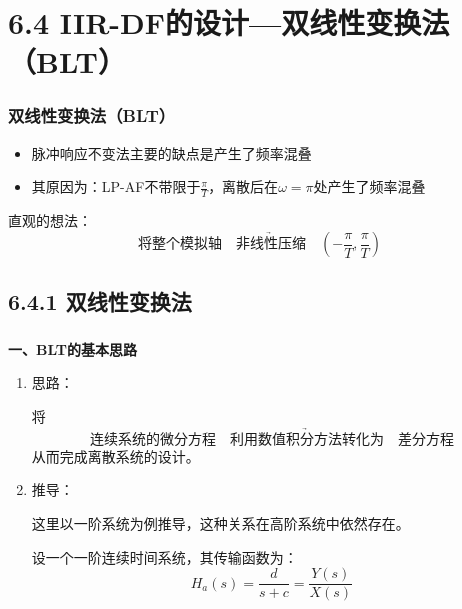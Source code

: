 \documentclass[notheorems,compress,mathserif,table]{beamer}
\begin{document}
\section{6.4 IIR-DF的设计—双线性变换法（BLT）}

\begin{frame}\frametitle{双线性变换法（BLT）}%
\begin{itemize}
    \item 脉冲响应不变法主要的缺点是产生了频率混叠
    \item 其原因为：LP-AF不带限于$\frac{\pi}{T}$，离散后在$\omega = \pi$处产生了频率混叠
  \end{itemize}

   直观的想法：
   $$\mbox{将整个模拟轴}\underrightarrow{\quad\mbox{非线性压缩}\quad}
   (-\frac{\pi}{T},\frac{\pi}{T})$$
\end{frame}

\subsection{6.4.1 双线性变换法}
\begin{frame}[shrink]\frametitle{}%
\textbf{一、BLT的基本思路}


  \begin{enumerate}
    \item 思路：\par
      将
        $$\mbox{连续系统的微分方程} \underrightarrow{\quad\mbox{利用数值积分方法转化为}\quad} \mbox{差分方程}$$
       从而完成离散系统的设计。
    \item 推导：

    \par [注：]这里以一阶系统为例推导，这种关系在高阶系统中依然存在。\par
    设一个一阶连续时间系统，其传输函数为：
    $$H_a(s) = \frac{d}{s+c}=\frac{Y(s)}{X(s)}$$
\end{enumerate}
\end{frame}
\end{document}
